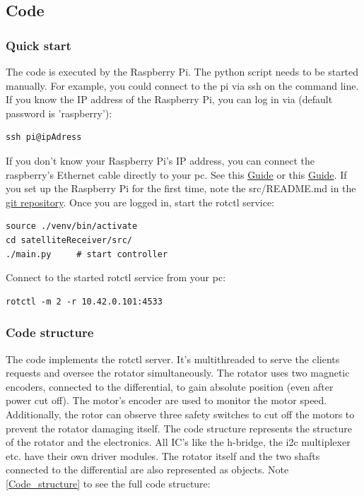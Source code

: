 \subsection{Code}

\subsubsection{Quick start}
The code is executed by the Raspberry Pi. The python script needs to be started manually. For example, you could connect to the pi via ssh on the command line. If you know the IP address of the Raspberry Pi, you can log in via (default password is 'raspberry'): 

\begin{verbatim}
ssh pi@ipAdress
\end{verbatim}

If you don't know your Raspberry Pi's IP address, you can connect the raspberry's Ethernet cable directly to your pc. See this  \href{https://www.circuitbasics.com/how-to-connect-to-a-raspberry-pi-directly-with-an-ethernet-cable/}{Guide} or this 
\href{https://stackoverflow.com/questions/16040128/hook-up-raspberry-pi-via-ethernet-to-laptop-without-router}{Guide}. If you set up the Raspberry Pi for the first time, note the src/README.md in the \href{https://github.com/EagleEyeElite/satelliteReceiver}{git repository}. Once you are logged in, start the rotctl service:

\begin{verbatim}
source ./venv/bin/activate
cd satelliteReceiver/src/
./main.py     # start controller
\end{verbatim}

Connect to the started rotctl service from your pc:
\begin{verbatim} 
rotctl -m 2 -r 10.42.0.101:4533
\end{verbatim}


\subsubsection{Code structure}

The code implements the rotctl server. It's multithreaded to serve the clients requests and oversee the rotator simultaneously. The rotator uses two magnetic encoders, connected to the differential, to gain absolute position (even after power cut off). The motor's encoder are used to monitor the motor speed. Additionally, the rotor can observe three safety switches to cut off the motors to prevent the rotator damaging itself.
The code structure represents the structure of the rotator and the electronics. All IC's like the h-bridge, the i2c multiplexer etc. have their own driver modules. The rotator itself and the two shafts connected to the differential are also represented as objects. Note \ref{Code_structure} to see the full code structure:


